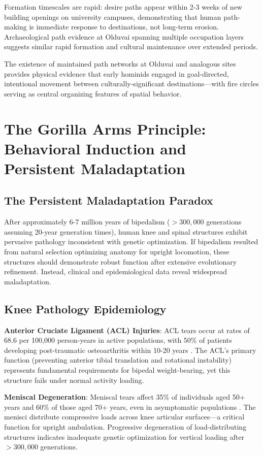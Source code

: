 \documentclass[12pt,a4paper]{article}
\begin{document}
Formation timescales are rapid: desire paths appear within 2-3 weeks of new building openings on university campuses, demonstrating that human path-making is immediate response to destinations, not long-term erosion. Archaeological path evidence at Olduvai spanning multiple occupation layers suggests similar rapid formation and cultural maintenance over extended periods.

The existence of maintained path networks at Olduvai and analogous sites provides physical evidence that early hominids engaged in goal-directed, intentional movement between culturally-significant destinations—with fire circles serving as central organizing features of spatial behavior.

\section{The Gorilla Arms Principle: Behavioral Induction and Persistent Maladaptation}
\subsection{The Persistent Maladaptation Paradox}

After approximately 6-7 million years of bipedalism ($>300,000$ generations assuming 20-year generation times), human knee and spinal structures exhibit pervasive pathology inconsistent with genetic optimization. If bipedalism resulted from natural selection optimizing anatomy for upright locomotion, these structures should demonstrate robust function after extensive evolutionary refinement. Instead, clinical and epidemiological data reveal widespread maladaptation.

\subsection{Knee Pathology Epidemiology}

\textbf{Anterior Cruciate Ligament (ACL) Injuries}: ACL tears occur at rates of 68.6 per 100,000 person-years in active populations, with 50\% of patients developing post-traumatic osteoarthritis within 10-20 years \citep{sanders2016incidence,lohmander2007high}. The ACL's primary function (preventing anterior tibial translation and rotational instability) represents fundamental requirements for bipedal weight-bearing, yet this structure fails under normal activity loading.

\textbf{Meniscal Degeneration}: Meniscal tears affect 35\% of individuals aged 50+ years and 60\% of those aged 70+ years, even in asymptomatic populations \citep{englund2008incidental}. The menisci distribute compressive loads across knee articular surfaces—a critical function for upright ambulation. Progressive degeneration of load-distributing structures indicates inadequate genetic optimization for vertical loading after $>300,000$ generations.
\end{document}
